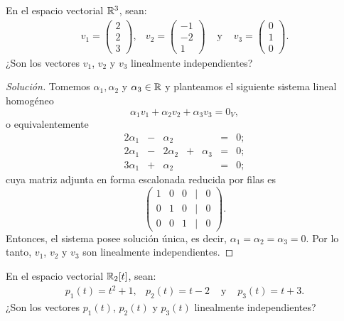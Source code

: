 \documentclass[a4,11pt]{aleph-notas}
\begin{document}
\begin{ejer}
    En el espacio vectorial $\mathbb{R}^{3}$, sean:
    \[
        \begin{array}{cccc}
            v_1 = \begin{pmatrix} 2\\ 2\\ 3 \end{pmatrix}, &
        v_2 = \begin{pmatrix} -1\\ -2\\ 1 \end{pmatrix} &
        \text{ y } &
        v_3 = \begin{pmatrix} 0\\ 1\\ 0 \end{pmatrix}.
        \end{array}
    \]
    ¿Son los vectores $v_1$, $v_2$ y $v_3$ linealmente independientes?
\end{ejer}

\begin{proof}[Solución]\hspace{0pt}
    Tomemos $\alpha_1, \alpha_2$ y $\alpha_3\in\mathbb{R}$ y planteamos el siguiente sistema lineal homogéneo
    \[
        \alpha_1 v_1 + \alpha_2 v_2 + \alpha_3 v_3 = 0_V,
    \]
    o equivalentemente
    \[
        \begin{array}{ccccccc}
            2\alpha_1 & - & \alpha_2 &  & & = & 0;\\
            2\alpha_1 & - & 2\alpha_2 & + & \alpha_3& = & 0;\\
            3\alpha_1 & + & \alpha_2 &  & & = & 0;
        \end{array}
    \]
    cuya matriz adjunta en forma escalonada reducida por filas es
    \[
        \begin{pmatrix}
            1 & 0 & 0 & | & 0\\
            0 & 1 & 0 & | & 0\\
            0 & 0 & 1 & | & 0
        \end{pmatrix}.
    \]
    Entonces, el sistema posee solución única, es decir, $\alpha_1 = \alpha_2 = \alpha_3 = 0$. Por lo tanto, $v_1$, $v_2$ y $v_3$ son linealmente independientes.
\end{proof}

\begin{ejer}
    En el espacio vectorial $\mathbb{R}_2[t]$, sean:
    \[
        \begin{array}{cccc}
            p_1(t) = t^2 + 1, & 
            p_2(t) = t - 2 &
            \text{ y } &
            p_3(t) = t + 3.
        \end{array}
    \]
    ¿Son los vectores $p_1(t)$, $p_2(t)$ y $p_3(t)$ linealmente independientes?
\end{ejer}
\end{document}
